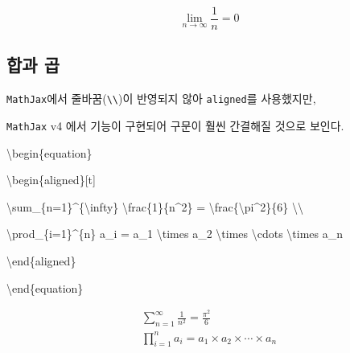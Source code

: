 \documentclass[
  letterpaper,
]{book}
\newenvironment{Shaded}{\begin{snugshade}}{\end{snugshade}}
\newcommand{\ExtensionTok}[1]{\textcolor[rgb]{0.00,0.23,0.31}{#1}}
\newcommand{\KeywordTok}[1]{\textcolor[rgb]{0.00,0.23,0.31}{#1}}
\newcommand{\NormalTok}[1]{\textcolor[rgb]{0.00,0.23,0.31}{#1}}
\newcommand{\SpecialCharTok}[1]{\textcolor[rgb]{0.37,0.37,0.37}{#1}}
\newcommand{\SpecialStringTok}[1]{\textcolor[rgb]{0.13,0.47,0.30}{#1}}
\begin{document}
\begin{equation}

\lim_{{n \to \infty}} \frac{1}{n} = 0

\end{equation}

\hypertarget{uxd569uxacfc-uxacf1}{%
\subsection{합과 곱}\label{uxd569uxacfc-uxacf1}}

\texttt{MathJax}에서 줄바꿈(\texttt{\textbackslash{}\textbackslash{}})이
반영되지 않아 \texttt{aligned}를 사용했지만,

\texttt{MathJax} v4 에서 기능이 구현되어 구문이 훨씬 간결해질 것으로
보인다.

\begin{Shaded}
\begin{Highlighting}[]
\KeywordTok{\textbackslash{}begin}\NormalTok{\{}\ExtensionTok{equation}\NormalTok{\}}

\KeywordTok{\textbackslash{}begin}\NormalTok{\{}\ExtensionTok{aligned}\NormalTok{\}}\SpecialStringTok{[t]}

\SpecialCharTok{\textbackslash{}sum}\SpecialStringTok{\_\{n=1\}\^{}\{}\SpecialCharTok{\textbackslash{}infty}\SpecialStringTok{\} }\SpecialCharTok{\textbackslash{}frac}\SpecialStringTok{\{1\}\{n\^{}2\} = }\SpecialCharTok{\textbackslash{}frac}\SpecialStringTok{\{}\SpecialCharTok{\textbackslash{}pi}\SpecialStringTok{\^{}2\}\{6\} }\SpecialCharTok{\textbackslash{}\textbackslash{}}

\SpecialCharTok{\textbackslash{}prod}\SpecialStringTok{\_\{i=1\}\^{}\{n\} a\_i = a\_1 }\SpecialCharTok{\textbackslash{}times}\SpecialStringTok{ a\_2 }\SpecialCharTok{\textbackslash{}times}\SpecialStringTok{ }\SpecialCharTok{\textbackslash{}cdots}\SpecialStringTok{ }\SpecialCharTok{\textbackslash{}times}\SpecialStringTok{ a\_n}

\KeywordTok{\textbackslash{}end}\NormalTok{\{}\ExtensionTok{aligned}\NormalTok{\}}

\KeywordTok{\textbackslash{}end}\NormalTok{\{}\ExtensionTok{equation}\NormalTok{\}}
\end{Highlighting}
\end{Shaded}

\begin{equation}

\begin{aligned}

\sum_{n=1}^{\infty} \frac{1}{n^2} = \frac{\pi^2}{6} \\

\prod_{i=1}^{n} a_i = a_1 \times a_2 \times \cdots \times a_n

\end{aligned}

\end{equation}
\end{document}
